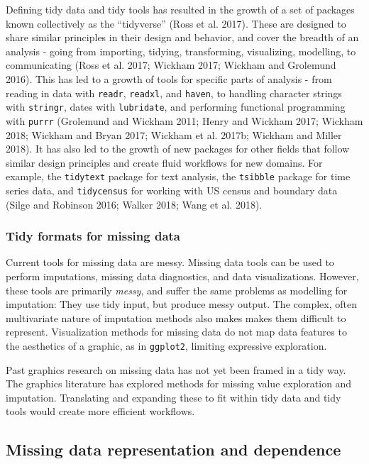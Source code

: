 \documentclass[]{article}
\theoremstyle{definition}
\theoremstyle{definition}
\theoremstyle{definition}
\theoremstyle{remark}
\begin{document}
Defining tidy data and tidy tools has resulted in the growth of a set of
packages known collectively as the ``tidyverse'' (Ross et al. 2017).
These are designed to share similar principles in their design and
behavior, and cover the breadth of an analysis - going from importing,
tidying, transforming, visualizing, modelling, to communicating (Ross et
al. 2017; Wickham 2017; Wickham and Grolemund 2016). This has led to a
growth of tools for specific parts of analysis - from reading in data
with \texttt{readr}, \texttt{readxl}, and \texttt{haven}, to handling
character strings with \texttt{stringr}, dates with \texttt{lubridate},
and performing functional programming with \texttt{purrr} (Grolemund and
Wickham 2011; Henry and Wickham 2017; Wickham 2018; Wickham and Bryan
2017; Wickham et al. 2017b; Wickham and Miller 2018). It has also led to
the growth of new packages for other fields that follow similar design
principles and create fluid workflows for new domains. For example, the
\texttt{tidytext} package for text analysis, the \texttt{tsibble}
package for time series data, and \texttt{tidycensus} for working with
US census and boundary data (Silge and Robinson 2016; Walker 2018; Wang
et al. 2018).

\hypertarget{tidy-formats-missing-data}{%
\subsubsection{Tidy formats for missing
data}\label{tidy-formats-missing-data}}

Current tools for missing data are messy. Missing data tools can be used
to perform imputations, missing data diagnostics, and data
visualizations. However, these tools are primarily \emph{messy}, and
suffer the same problems as modelling for imputation: They use tidy
input, but produce messy output. The complex, often multivariate nature
of imputation methods also makes makes them difficult to represent.
Visualization methods for missing data do not map data features to the
aesthetics of a graphic, as in \texttt{ggplot2}, limiting expressive
exploration.

Past graphics research on missing data has not yet been framed in a tidy
way. The graphics literature has explored methods for missing value
exploration and imputation. Translating and expanding these to fit
within tidy data and tidy tools would create more efficient workflows.

\hypertarget{missing-data-rep-dep}{%
\subsection{Missing data representation and
dependence}\label{missing-data-rep-dep}}
\end{document}
